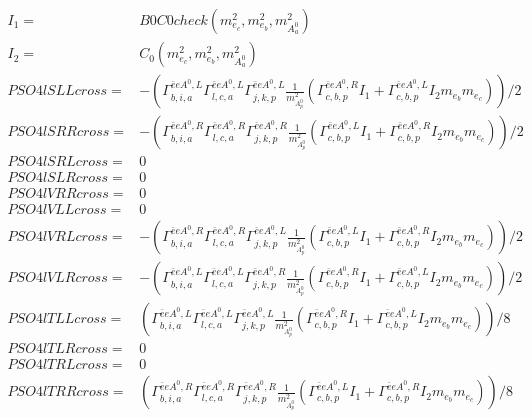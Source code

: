 \documentclass[A4,landscape]{article}
\begin{document}
\begin{align} 
I_1= & B0C0check(m^2_{e_{{c}}}, m^2_{e_{{b}}}, m^2_{A^0_{{a}}}) \\ 
I_2= & C_0(m^2_{e_{{c}}}, m^2_{e_{{b}}}, m^2_{A^0_{{a}}}) \\ 
  PSO4lSLLcross= & -( \Gamma^{\bar{e}e A^0 ,L}_{b, i, a} \Gamma^{\bar{e}e A^0 ,L}_{l, c, a} \Gamma^{\bar{e}e A^0 ,L}_{j, k, p} \frac{1}{m^2_{A^0_{{p}}}} (\Gamma^{\bar{e}e A^0 ,R}_{c, b, p} I_1 + \Gamma^{\bar{e}e A^0 ,L}_{c, b, p} I_2 m_{e_{{b}}} m_{e_{{c}}}))/2 \\ 
  PSO4lSRRcross= & -( \Gamma^{\bar{e}e A^0 ,R}_{b, i, a} \Gamma^{\bar{e}e A^0 ,R}_{l, c, a} \Gamma^{\bar{e}e A^0 ,R}_{j, k, p} \frac{1}{m^2_{A^0_{{p}}}} (\Gamma^{\bar{e}e A^0 ,L}_{c, b, p} I_1 + \Gamma^{\bar{e}e A^0 ,R}_{c, b, p} I_2 m_{e_{{b}}} m_{e_{{c}}}))/2 \\ 
  PSO4lSRLcross= & 0 \\ 
  PSO4lSLRcross= & 0 \\ 
  PSO4lVRRcross= & 0 \\ 
  PSO4lVLLcross= & 0 \\ 
  PSO4lVRLcross= & -( \Gamma^{\bar{e}e A^0 ,R}_{b, i, a} \Gamma^{\bar{e}e A^0 ,R}_{l, c, a} \Gamma^{\bar{e}e A^0 ,L}_{j, k, p} \frac{1}{m^2_{A^0_{{p}}}} (\Gamma^{\bar{e}e A^0 ,L}_{c, b, p} I_1 + \Gamma^{\bar{e}e A^0 ,R}_{c, b, p} I_2 m_{e_{{b}}} m_{e_{{c}}}))/2 \\ 
  PSO4lVLRcross= & -( \Gamma^{\bar{e}e A^0 ,L}_{b, i, a} \Gamma^{\bar{e}e A^0 ,L}_{l, c, a} \Gamma^{\bar{e}e A^0 ,R}_{j, k, p} \frac{1}{m^2_{A^0_{{p}}}} (\Gamma^{\bar{e}e A^0 ,R}_{c, b, p} I_1 + \Gamma^{\bar{e}e A^0 ,L}_{c, b, p} I_2 m_{e_{{b}}} m_{e_{{c}}}))/2 \\ 
  PSO4lTLLcross= & ( \Gamma^{\bar{e}e A^0 ,L}_{b, i, a} \Gamma^{\bar{e}e A^0 ,L}_{l, c, a} \Gamma^{\bar{e}e A^0 ,L}_{j, k, p} \frac{1}{m^2_{A^0_{{p}}}} (\Gamma^{\bar{e}e A^0 ,R}_{c, b, p} I_1 + \Gamma^{\bar{e}e A^0 ,L}_{c, b, p} I_2 m_{e_{{b}}} m_{e_{{c}}}))/8 \\ 
  PSO4lTLRcross= & 0 \\ 
  PSO4lTRLcross= & 0 \\ 
  PSO4lTRRcross= & ( \Gamma^{\bar{e}e A^0 ,R}_{b, i, a} \Gamma^{\bar{e}e A^0 ,R}_{l, c, a} \Gamma^{\bar{e}e A^0 ,R}_{j, k, p} \frac{1}{m^2_{A^0_{{p}}}} (\Gamma^{\bar{e}e A^0 ,L}_{c, b, p} I_1 + \Gamma^{\bar{e}e A^0 ,R}_{c, b, p} I_2 m_{e_{{b}}} m_{e_{{c}}}))/8 \\ 
\end{align} 
\end{document}
